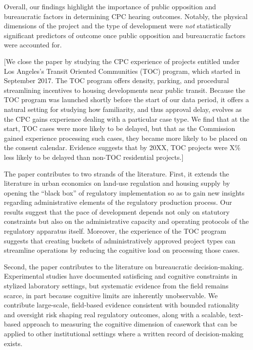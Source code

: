Overall, our findings highlight the importance of public opposition and bureaucratic factors in determining CPC hearing outcomes. Notably, the physical dimensions of the project and the type of development were \emph{not} statistically significant predictors of outcome once public opposition and bureaucratic factors were accounted for. 

[We close the paper by studying the CPC experience of projects entitled under Los Angeles's Transit Oriented Communities (TOC) program, which started in September 2017. The TOC program offers density, parking, and procedural streamlining incentives to housing developments near public transit. Because the TOC program was launched shortly before the start of our data period, it offers a natural setting for studying how familiarity, and thus approval delay, evolves as the CPC gains experience dealing with a particular case type. We find that at the start, TOC cases were more likely to be delayed, but that as the Commission gained experience processing such cases, they became more likely to be placed on the consent calendar. Evidence suggests that by 20XX, TOC projects were X\% less likely to be delayed than non-TOC residential projects.]

The paper contributes to two strands of the literature. First, it extends the literature in urban economics on land-use regulation and housing supply by opening the ``black box'' of regulatory implementation so as to gain new insights regarding administrative elements of the regulatory production process. Our results suggest that the pace of development depends not only on statutory constraints but also on the administrative capacity and operating protocols of the regulatory apparatus itself. Moreover, the experience of the TOC program suggests that creating buckets of administratively approved project types can streamline operations by reducing the cognitive load on processing those cases.


Second, the paper contributes to the literature on bureaucratic decision-making. Experimental studies have documented satisficing and cognitive constraints in stylized laboratory settings, but systematic evidence from the field remains scarce, in part because cognitive limits are inherently unobservable. We contribute large-scale, field-based evidence consistent with bounded rationality and oversight risk shaping real regulatory outcomes, along with a scalable, text-based approach to measuring the cognitive dimension of casework that can be applied to other institutional settings where a written record of decision-making exists.

